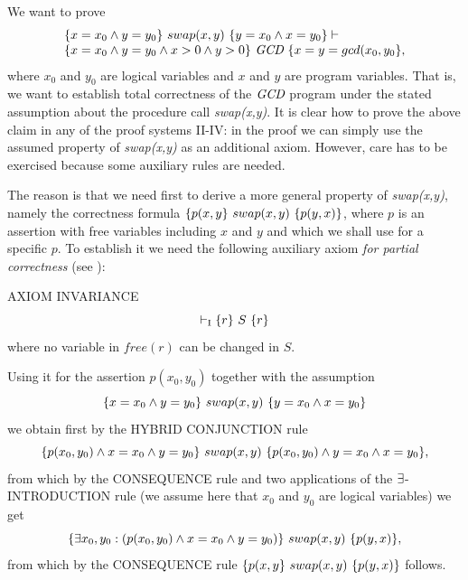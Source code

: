 \documentclass[manuscript, screen, review]{acmart}
\begin{document}
We want to prove 
\begin{equation}
 \begin{array}{l}  
\mbox{$\{{x=x_0 \wedge y=y_0}\}\ {swap(x,y)}\ \{{y=x_0 \wedge x=y_0}\}$} \vdash  \\
   \mbox{$\{{x=x_0 \wedge y=y_0 \wedge x>0 \wedge y>0}\}\ {\mbox{{\it GCD}}}\ \{{x=y=gcd(x_0, y_0}\}$},
 \end{array}
 \label{equ:gcd}
\end{equation}
where $x_0$ and $y_0$ are logical variables and $x$ and $y$ are
program variables.  That is, we want to establish total correctness of
the $\mbox{{\it GCD}}$ program under the stated assumption about the procedure
call \emph{swap(x,y)}.  It is clear how to prove the above claim in
any of the proof systems II-IV: in the proof we can simply use the
assumed property of \emph{swap(x,y)} as an additional axiom. However,
care has to be exercised because some auxiliary rules are needed.

The reason is that we need first to derive a more general property of
\emph{swap(x,y)}, namely the correctness formula
$\mbox{$\{{p(x,y}\}\ {swap(x,y)}\ \{{p(y,x)}\}$}$, where $p$ is an assertion with free
variables including $x$ and $y$ and which we shall use for a specific
$p$.  To establish it we need the following auxiliary axiom \emph{for
  partial correctness} (see \cite[page 98]{ABO09}):

\III

\NI
AXIOM INVARIANCE
\[ 
\vdash_{\mathrm{I}} \mbox{$\{{r}\}\ {S}\ \{{r}\}$}
\]
where no variable in $\mathit{free}(r)$ can be changed in $S$.
\III


Using it for the assertion $p(x_0,y_0)$
together with the assumption
\[
  \mbox{$\{{x=x_0 \wedge y=y_0}\}\ {swap(x,y)}\ \{{y=x_0 \wedge x=y_0}\}$}
\]
we obtain first by the HYBRID CONJUNCTION rule
\[
  \mbox{$\{{p(x_0,y_0) \wedge x=x_0 \wedge y=y_0}\}\ {swap(x,y)}\ \{{p(x_0,y_0) \wedge y=x_0 \wedge x=y_0}\}$},
\]
from which by the CONSEQUENCE rule and two applications of
the $\mbox{$\exists$}$-INTRODUCTION rule (we assume here that $x_0$ and $y_0$ are logical variables)
we get
\[
  \mbox{$\{{\mbox{$\exists$} x_0, y_0: (p(x_0,y_0) \wedge x=x_0 \wedge y=y_0)}\}\ {swap(x,y)}\ \{{p(y,x)}\}$},
\]
from which  by the CONSEQUENCE rule $\mbox{$\{{p(x,y}\}\ {swap(x,y)}\ \{{p(y,x)}\}$}$ follows.


\end{document}
